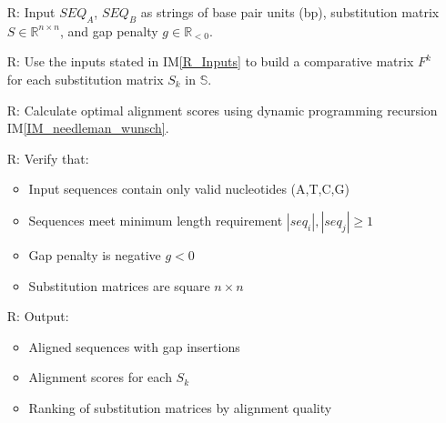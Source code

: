 \documentclass[12pt]{article}
\newcommand{\iref}[1]{IM\ref{#1}}
\newcounter{reqnum} %
\begin{document}
\noindent \begin{itemize}

\item[R\refstepcounter{reqnum}\thereqnum \label{R_Inputs}:] Input $SEQ_A$, $SEQ_B$ as 
strings of base pair units (bp), substitution matrix $S \in \mathbb{R}^{n \times n}$, and gap penalty $g \in \mathbb{R}_{<0}$.


\item[R\refstepcounter{reqnum}\thereqnum \label{R_OutputInputs}:] Use the inputs 
stated in \iref{R_Inputs} to build a comparative matrix $F^k$ for 
each substitution matrix $S_k$ in $\mathbb{S}$.


\item[R\refstepcounter{reqnum}\thereqnum \label{R_Calculate}:] Calculate optimal 
alignment scores using dynamic programming recursion \iref{IM_needleman_wunsch}.

\item[R\refstepcounter{reqnum}\thereqnum \label{R_VerifyOutput}:] Verify that:
\begin{itemize}
\item Input sequences contain only valid nucleotides (A,T,C,G)
\item Sequences meet minimum length requirement $|seq_i|, |seq_j| \geq 1$
\item Gap penalty is negative $g < 0$
\item Substitution matrices are square $n \times n$
\end{itemize}

\item[R\refstepcounter{reqnum}\thereqnum \label{R_Output}:] Output:
\begin{itemize}
\item Aligned sequences with gap insertions
\item Alignment scores for each $S_k$
\item Ranking of substitution matrices by alignment quality
\end{itemize}

\end{itemize}

\end{document}

